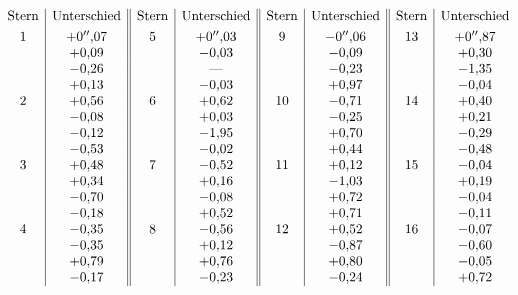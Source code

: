 {\small
\[
\begin{array}{@{}c|c||c|c||c|c||c|c@{}}
\text{Stern}&\text{Unterschied}&\text{Stern}&\text{Unterschied}&
\text{Stern}&\text{Unterschied}&\text{Stern}&\text{Unterschied}\\[.8ex]
1&+0''{,}07&5&+0''{,}03&9&-0''{,}06&13&+0''{,}87\\
&+0{,}09&&-0{,}03&&-0{,}09&&+0{,}30\\
&-0{,}26&&\text{—}&&-0{,}23&&-1{,}35\\
&+0{,}13&&-0{,}03&&+0{,}97&&-0{,}04\\
2&+0{,}56&6&+0{,}62&10&-0{,}71&14&+0{,}40\\
&-0{,}08&&+0{,}03&&-0{,}25&&+0{,}21\\
&-0{,}12&&-1{,}95&&+0{,}70&&-0{,}29\\
&-0{,}53&&-0{,}02&&+0{,}44&&-0{,}48\\
3&+0{,}48&7&-0{,}52&11&+0{,}12&15&-0{,}04\\
&+0{,}34&&+0{,}16&&-1{,}03&&+0{,}19\\
&-0{,}70&&-0{,}08&&+0{,}72&&-0{,}04\\
&-0{,}18&&+0{,}52&&+0{,}71&&-0{,}11\\
4&-0{,}35&8&-0{,}56&12&+0{,}52&16&-0{,}07\\
&-0{,}35&&+0{,}12&&-0{,}87&&-0{,}60\\
&+0{,}79&&+0{,}76&&+0{,}80&&-0{,}05\\
&-0{,}17&&-0{,}23&&-0{,}24&&+0{,}72
\end{array}
\]
\par
}

\par\clearpage
\noindent\makebox[12mm][l]{}\par\medskip

